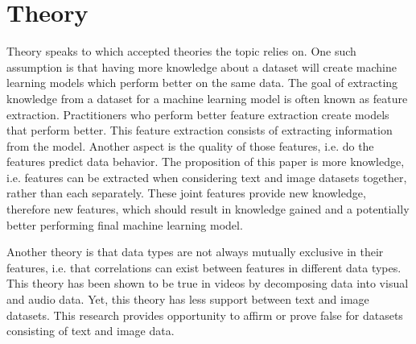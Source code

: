 \section{Theory} %

Theory speaks to which accepted theories the topic relies on.  One such assumption is that having more knowledge about a dataset will create machine learning models which perform better on the same data.  The goal of extracting knowledge from a dataset for a machine learning model is often known as feature extraction.  Practitioners who perform better feature extraction create models that perform better.  This feature extraction consists of extracting information from the model.  Another aspect is the quality of those features, i.e. do the features predict data behavior.  The proposition of this paper is more knowledge, i.e. features can be extracted when considering text and image datasets together, rather than each separately.  These joint features provide new knowledge, therefore new features, which should result in knowledge gained and a potentially better performing final machine learning model.  

Another theory is that data types are not always mutually exclusive in their features, i.e. that correlations can exist between features in different data types.  This theory has been shown to be true in videos by decomposing data into visual and audio data.  Yet, this theory has less support between text and image datasets.  This research provides opportunity to affirm or prove false for datasets consisting of text and image data.  


